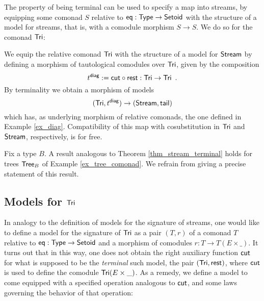\documentclass[a4paper,USenglish]{lipics}
\begin{document}
The property of being terminal can be used to specify a map into streams, by equipping some comonad $S$ relative to $\mathsf{eq}:\mathsf{Type}\to\mathsf{Setoid}$
with the structure of a model for streams, that is, with a comodule morphism $S\to S$.
We do so for the comonad $\mathsf{Tri}$:

\begin{example}\label{ex_diag_terminal}
  We equip the relative comonad $\mathsf{Tri}$ with the structure of a model for $\mathsf{Stream}$ by defining a 
  morphism of tautological comodules over $\mathsf{Tri}$, given by the composition
   \[ t^{\mathsf{diag}} := {\mathsf{cut}} \circ {\ensuremath{\mathsf{rest}}}  : \mathsf{Tri} \to \mathsf{Tri} \enspace . \]
  By terminality we obtain a morphism of models
   \[(\mathsf{Tri}, t^{\mathsf{diag}}) \to (\mathsf{Stream}, \mathsf{tail}) \] 
  which has, as underlying morphism of relative comonads, the one defined in Example \ref{ex_diag}. 
  Compatibility of this map with cosubstitution in $\mathsf{Tri}$ and $\mathsf{Stream}$, respectively,
  is for free.
\end{example}

 
\begin{rem}
 Fix a type $B$. A result analogous to Theorem \ref{thm_stream_terminal} holds for trees $\mathsf{Tree}_B$ of Example \ref{ex_tree_comonad}. 
 We refrain from giving a precise statement of this result.
\end{rem}


\subsection{Models for $\mathsf{Tri}$}

In analogy to the definition of models for the signature of streams, one would like to define
a model for the signature of $\mathsf{Tri}$ as a pair $(T,r)$ of a comonad $T$ relative to $\mathsf{eq} : \mathsf{Type} \to \mathsf{Setoid}$ and 
a morphism of comodules $r : T \to T(E\times \_)$. 
It turns out that in this way, one does not obtain the right auxiliary function $\mathsf{cut}$ for what is
supposed to be the \emph{terminal} such model, the pair $(\mathsf{Tri},\mathsf{rest})$, where $\mathsf{cut}$ is used to define the comodule $\mathsf{Tri}(E\times \_)$.
As a remedy, we define a model to come equipped with a specified operation analogous to $\mathsf{cut}$, and some laws governing
the behavior of that operation:
\end{document}
